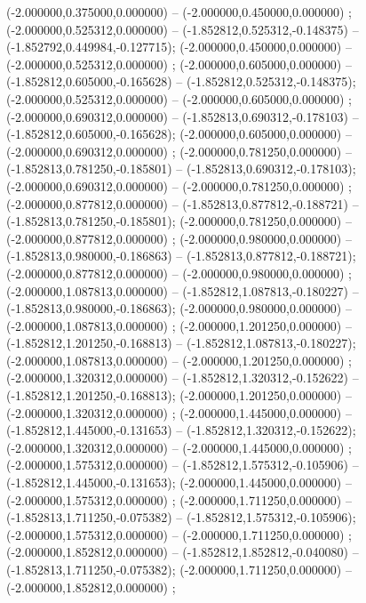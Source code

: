  (-2.000000,0.375000,0.000000) -- (-2.000000,0.450000,0.000000) ;
 (-2.000000,0.525312,0.000000) -- (-1.852812,0.525312,-0.148375) -- (-1.852792,0.449984,-0.127715);
 (-2.000000,0.450000,0.000000) -- (-2.000000,0.525312,0.000000) ;
 (-2.000000,0.605000,0.000000) -- (-1.852812,0.605000,-0.165628) -- (-1.852812,0.525312,-0.148375);
 (-2.000000,0.525312,0.000000) -- (-2.000000,0.605000,0.000000) ;
 (-2.000000,0.690312,0.000000) -- (-1.852813,0.690312,-0.178103) -- (-1.852812,0.605000,-0.165628);
 (-2.000000,0.605000,0.000000) -- (-2.000000,0.690312,0.000000) ;
 (-2.000000,0.781250,0.000000) -- (-1.852813,0.781250,-0.185801) -- (-1.852813,0.690312,-0.178103);
 (-2.000000,0.690312,0.000000) -- (-2.000000,0.781250,0.000000) ;
 (-2.000000,0.877812,0.000000) -- (-1.852813,0.877812,-0.188721) -- (-1.852813,0.781250,-0.185801);
 (-2.000000,0.781250,0.000000) -- (-2.000000,0.877812,0.000000) ;
 (-2.000000,0.980000,0.000000) -- (-1.852813,0.980000,-0.186863) -- (-1.852813,0.877812,-0.188721);
 (-2.000000,0.877812,0.000000) -- (-2.000000,0.980000,0.000000) ;
 (-2.000000,1.087813,0.000000) -- (-1.852812,1.087813,-0.180227) -- (-1.852813,0.980000,-0.186863);
 (-2.000000,0.980000,0.000000) -- (-2.000000,1.087813,0.000000) ;
 (-2.000000,1.201250,0.000000) -- (-1.852812,1.201250,-0.168813) -- (-1.852812,1.087813,-0.180227);
 (-2.000000,1.087813,0.000000) -- (-2.000000,1.201250,0.000000) ;
 (-2.000000,1.320312,0.000000) -- (-1.852812,1.320312,-0.152622) -- (-1.852812,1.201250,-0.168813);
 (-2.000000,1.201250,0.000000) -- (-2.000000,1.320312,0.000000) ;
 (-2.000000,1.445000,0.000000) -- (-1.852812,1.445000,-0.131653) -- (-1.852812,1.320312,-0.152622);
 (-2.000000,1.320312,0.000000) -- (-2.000000,1.445000,0.000000) ;
 (-2.000000,1.575312,0.000000) -- (-1.852812,1.575312,-0.105906) -- (-1.852812,1.445000,-0.131653);
 (-2.000000,1.445000,0.000000) -- (-2.000000,1.575312,0.000000) ;
 (-2.000000,1.711250,0.000000) -- (-1.852813,1.711250,-0.075382) -- (-1.852812,1.575312,-0.105906);
 (-2.000000,1.575312,0.000000) -- (-2.000000,1.711250,0.000000) ;
 (-2.000000,1.852812,0.000000) -- (-1.852812,1.852812,-0.040080) -- (-1.852813,1.711250,-0.075382);
 (-2.000000,1.711250,0.000000) -- (-2.000000,1.852812,0.000000) ;
